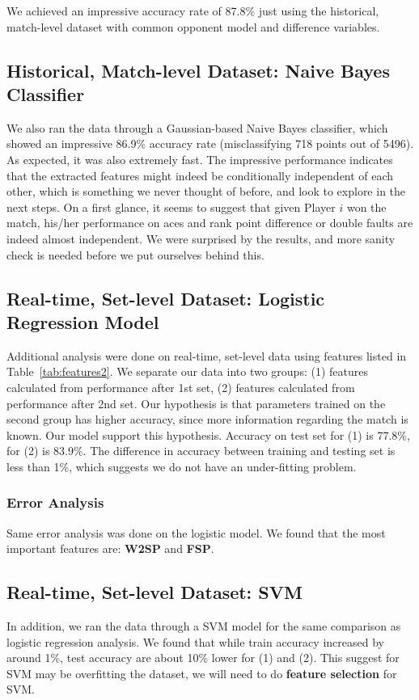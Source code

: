 \documentclass[paper=a4, fontsize=11pt]{scrartcl} %
\numberwithin{equation}{section} %
\numberwithin{figure}{section} %
\numberwithin{table}{section} %
\begin{document}
We achieved an impressive accuracy rate of 87.8\% just using the historical, match-level dataset with common opponent model and difference variables. 

\subsection{Historical, Match-level Dataset: Naive Bayes Classifier}
We also ran the data through a Gaussian-based Naive Bayes classifier, which showed an impressive 86.9\% accuracy rate (misclassifying 718 points out of 5496). As expected, it was also extremely fast. The impressive performance indicates that the extracted features might indeed be conditionally independent of each other, which is something we never thought of before, and look to explore in the next steps. On a first glance, it seems to suggest that given Player $i$ won the match, his/her performance on aces and rank point difference or double faults are indeed almost independent. We were surprised by the results, and more sanity check is needed before we put ourselves behind this. 
\subsection{Real-time, Set-level Dataset: Logistic Regression Model}
Additional analysis were done on real-time, set-level data using features listed in Table~\ref{tab:features2}. We separate our data into two groups: (1) features calculated from performance after 1st set, (2) features calculated from performance after 2nd set.  Our hypothesis is that parameters trained on the second group has higher accuracy, since more information regarding the match is known.  Our model support this hypothesis.  Accuracy on test set for (1) is 77.8\%, for (2) is 83.9\%.  The difference in accuracy between training and testing set is less than 1\%, which suggests we do not have an under-fitting problem.
\subsubsection{Error Analysis}
Same error analysis was done on the logistic model.  We found that the most important features are: \textbf{W2SP} and \textbf{FSP}.
\subsection{Real-time, Set-level Dataset:  SVM}
In addition, we ran the data through a SVM model for the same comparison as logistic regression analysis.  We found that while train accuracy increased by around 1\%, test accuracy are about 10\%  lower for (1) and (2).  This suggest for SVM may be overfitting the dataset, we will need to do \textbf{feature selection} for SVM.
\end{document}
